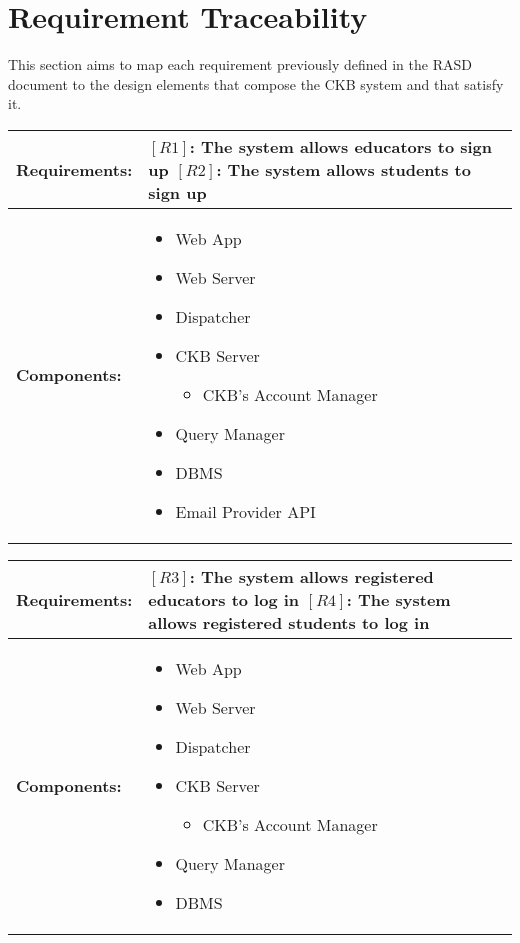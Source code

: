 \section{Requirement Traceability}

This section aims to map each requirement previously defined in the RASD document to the design elements that compose the CKB system and that satisfy it.

\vspace{1cm}

\begin{table}[H]
  \centering
  \begin{tabularx}{\textwidth}{|p{3cm}|X|}
    \hline
    \textbf{Requirements:} &
    $[R1]$: The system allows educators to sign up
    \newline$[R2]$: The system allows students to sign up
    \\
    \hline
    \textbf{Components:} & 
    \begin{itemize}
        \item Web App
        \item Web Server
        \item Dispatcher 
        \item CKB Server 
        \begin{itemize}
            \item CKB's Account Manager 
        \end{itemize}
        \item Query Manager
        \item DBMS
        \item Email Provider API
    \end{itemize}
    \\
    \hline
  \end{tabularx}
\end{table}


\begin{table}[H]
  \centering
  \begin{tabularx}{\textwidth}{|p{3cm}|X|}
    \hline
    \textbf{Requirements:} &
    $[R3]$: The system allows registered educators to log in
    \newline$[R4]$: The system allows registered students to log in
    \\
    \hline
    \textbf{Components:} & 
    \begin{itemize}
        \item Web App
        \item Web Server
        \item Dispatcher 
        \item CKB Server 
        \begin{itemize}
            \item CKB's Account Manager 
        \end{itemize}
        \item Query Manager
        \item DBMS
    \end{itemize}
    \\
    \hline
  \end{tabularx}
\end{table}


